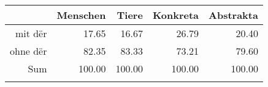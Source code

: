 \begin{tabular}{rrrrr}
  \lsptoprule
 & Menschen & Tiere & Konkreta & Abstrakta \\ 
  \midrule
mit dër & 17.65 & 16.67 & 26.79 & 20.40 \\ 
  ohne dër & 82.35 & 83.33 & 73.21 & 79.60 \\ 
  Sum & 100.00 & 100.00 & 100.00 & 100.00 \\ 
   \lspbottomrule
\end{tabular}
